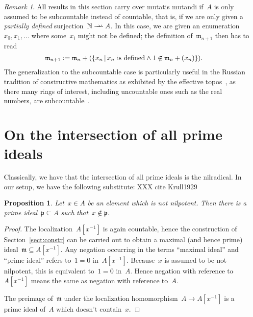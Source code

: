 \documentclass[oneside,reqno]{amsart}
\theoremstyle{definition}
\theoremstyle{plain}
\newtheorem{prop}[defn]{Proposition}
\theoremstyle{remark}
\newtheorem{rem}[defn]{Remark}
\newcommand{\mmm}{\mathfrak{m}}
\newcommand{\ppp}{\mathfrak{p}}
\newcommand{\NN}{\mathbb{N}}
\newcommand{\defeq}{\vcentcolon=}
\renewcommand{\_}{\mathpunct{.}\,}
\begin{document}
\newcommand{\rightrightharpoonup}{\mathrel{\mathrlap{\rightharpoonup}\mkern1mu\rightharpoonup}}
\begin{rem}All results in this section carry over mutatis mutandi if~$A$ is
only assumed to be subcountable instead of countable, that is, if we are only
given a \emph{partially defined} surjection~$\NN \rightrightharpoonup A$. In
this case, we are given an enumeration~$x_0,x_1,\ldots$ where some~$x_i$
might not be defined; the definition of~$\mmm_{n+1}$ then has to read
\begin{align*}
  \mmm_{n+1} &\defeq \mmm_n + (\{ x_n \,|\, \text{$x_n$ is defined} \wedge 1 \not\in \mmm_n + (x_n) \}).
\end{align*}
The generalization to the subcountable case is particularly useful in the
Russian tradition of constructive mathematics as exhibited by the ef{}fective
topos~\cite{hyland:effective-topos,oosten:realizability,phoa:effective,bauer:c2c},
as there many rings of interest, including uncountable ones such as the real
numbers, are subcountable~\cite[Prop.~7.2]{hyland:effective-topos}.
\end{rem}


\section{On the intersection of all prime ideals}

Classically, we have that the intersection of all prime ideals is the
nilradical. In our setup, we have the following substitute:
XXX cite Krull1929

\begin{prop}\label{prop:nilp-prime}Let~$x \in A$ be an element which is not nilpotent. Then there is a
prime ideal~$\ppp \subseteq A$ such that~$x \not\in \ppp$.
\end{prop}

\begin{proof}The localization~$A[x^{-1}]$ is again countable, hence the
construction of Section~\ref{sect:constr} can be carried out to obtain a
maximal (and hence prime) ideal~$\mmm \subseteq A[x^{-1}]$. Any negation
occurring in the terms ``maximal ideal'' and ``prime ideal'' refers to~$1 = 0$
in~$A[x^{-1}]$. Because~$x$ is assumed to be not nilpotent, this is equivalent
to~$1 = 0$ in~$A$. Hence negation with reference to~$A[x^{-1}]$ means the same
as negation with reference to~$A$.

The preimage of~$\mmm$ under the localization homomorphism~$A \to A[x^{-1}]$ is
a prime ideal of~$A$ which doesn't contain~$x$.
\end{proof}
\end{document}
